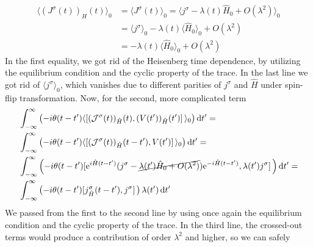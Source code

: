 \begin{align}
    \langle (J^{\sigma }(t))_{H}(t) \rangle_0
     & = \langle J^{\sigma }(t) \rangle_0 =
    \langle j^{\sigma } - \lambda(t)\hat{H} _0 + O(\lambda ^2) \rangle_0 \nonumber               \\
     & = \langle j^{\sigma } \rangle_0 - \lambda(t) \langle \hat{H} _0 \rangle_0 + O(\lambda ^2) \\
     & =  -\lambda(t) \langle \hat{H} _0 \rangle_0 + O(\lambda ^2)
\end{align}
In the first equality, we got rid of the Heisenberg time dependence, by utilizing the equilibrium
condition and the cyclic property of the trace. In the last line we got rid of \(\langle j^{\sigma } \rangle_0\),
which vanishes due to different parities of \(j^{\sigma }\) and \(\hat{H} \) under spin-flip transformation.
Now, for the second, more complicated term
\begin{align}
     & \int_{-\infty}^{\infty }   \left(-i \theta (t-t^{\prime} ) \langle \comm*{(\mathcal{J}^{\sigma }(t))_{\hat{H} }(t) }
    {(V(t^{\prime} ))_{\hat{H} }(t^{\prime} )} \rangle_0 \right) \dd{t^{\prime} } = \nonumber                                                                                                                         \\
     & \int_{-\infty}^{\infty }   \left(-i \theta (t-t^{\prime} ) \langle \comm*{(\mathcal{J}^{\sigma }(t))_{\hat{H} }(t-t^{\prime} ) }
    {V(t^{\prime} )} \rangle_0 \right) \dd{t^{\prime} } = \nonumber                                                                                                                                            \\
     & \int_{-\infty}^{\infty }   \left( -i \theta (t-t^{\prime} ) \comm*{\mathrm{e}^{i \hat{H} (t-t^{\prime} )} (j^{\sigma } -  \cancel{\lambda (t^{\prime} )\hat{H} _0 + O(\lambda ^2)}) \mathrm{e}^{-i \hat{H} (t-t^{\prime} )}}
    {\lambda (t^{\prime} ) j^{\sigma }} \right) \dd{t^{\prime} }=\nonumber                                                                                                                                     \\
     & \int_{-\infty}^{\infty }   \left( -i \theta (t-t^{\prime} ) \comm*{j^{\sigma }_{\hat{H} }(t-t^{\prime} )} {j^{\sigma }} \right) \lambda (t^{\prime} )\dd{t^{\prime} }
\end{align}
We passed from the first to the second line by using once again the equilibrium condition and the cyclic property of the trace.
In the third line, the crossed-out terms would produce a contribution of order \(\lambda ^2\) and higher, so we can safely
